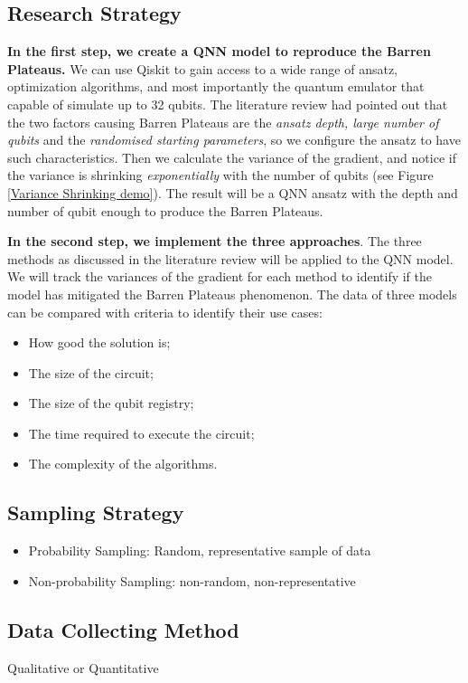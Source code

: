\subsection{Research Strategy}
\textbf{In the first step, we create a QNN model to reproduce the Barren Plateaus.} 
We can use Qiskit to gain access to a wide range of ansatz, optimization algorithms, and most importantly the quantum emulator that capable of simulate up to 32 qubits.
The literature review had pointed out that the two factors causing Barren Plateaus are the \textit{ansatz depth, large number of qubits} and the \textit{randomised starting parameters}, so we configure the ansatz to have such characteristics.
Then we calculate the variance of the gradient, and notice if the variance is shrinking \textit{exponentially} with the number of qubits (see Figure \ref{Variance Shrinking demo}).
The result will be a QNN ansatz with the depth and number of qubit enough to produce the Barren Plateaus.

\textbf{In the second step, we implement the three approaches}.
The three methods as discussed in the literature review will be applied to the QNN model.
We will track the variances of the gradient for each method to identify if the model has mitigated the Barren Plateaus phenomenon.
The data of three models can be compared with criteria to identify their use cases:
\begin{itemize}
    \item How good the solution is;
    \item The size of the circuit;
    \item The size of the qubit registry;
    \item The time required to execute the circuit;
    \item The complexity of the algorithms.
\end{itemize}

\subsection{Sampling Strategy}
\begin{itemize}
    \item Probability Sampling: Random, representative sample of data
    \item Non-probability Sampling: non-random, non-representative
\end{itemize}

\subsection{Data Collecting Method}
Qualitative or Quantitative


